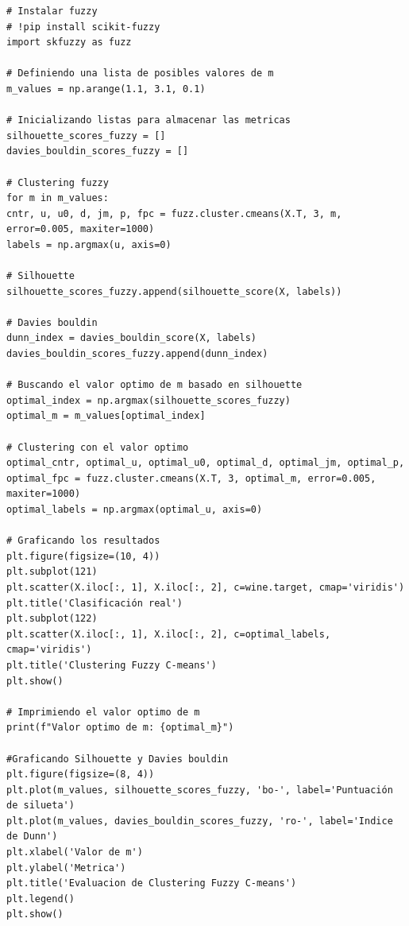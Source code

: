 \documentclass[a4paper, 12pt]{book}
\begin{document}
\begin{verbatim}
# Instalar fuzzy
# !pip install scikit-fuzzy
import skfuzzy as fuzz

# Definiendo una lista de posibles valores de m
m_values = np.arange(1.1, 3.1, 0.1)

# Inicializando listas para almacenar las metricas
silhouette_scores_fuzzy = []
davies_bouldin_scores_fuzzy = []

# Clustering fuzzy
for m in m_values:
cntr, u, u0, d, jm, p, fpc = fuzz.cluster.cmeans(X.T, 3, m, error=0.005, maxiter=1000)
labels = np.argmax(u, axis=0)

# Silhouette
silhouette_scores_fuzzy.append(silhouette_score(X, labels))

# Davies bouldin
dunn_index = davies_bouldin_score(X, labels)
davies_bouldin_scores_fuzzy.append(dunn_index)

# Buscando el valor optimo de m basado en silhouette
optimal_index = np.argmax(silhouette_scores_fuzzy)
optimal_m = m_values[optimal_index]

# Clustering con el valor optimo
optimal_cntr, optimal_u, optimal_u0, optimal_d, optimal_jm, optimal_p, optimal_fpc = fuzz.cluster.cmeans(X.T, 3, optimal_m, error=0.005, maxiter=1000)
optimal_labels = np.argmax(optimal_u, axis=0)

# Graficando los resultados
plt.figure(figsize=(10, 4))
plt.subplot(121)
plt.scatter(X.iloc[:, 1], X.iloc[:, 2], c=wine.target, cmap='viridis')
plt.title('Clasificación real')
plt.subplot(122)
plt.scatter(X.iloc[:, 1], X.iloc[:, 2], c=optimal_labels, cmap='viridis')
plt.title('Clustering Fuzzy C-means')
plt.show()

# Imprimiendo el valor optimo de m
print(f"Valor optimo de m: {optimal_m}")

#Graficando Silhouette y Davies bouldin
plt.figure(figsize=(8, 4))
plt.plot(m_values, silhouette_scores_fuzzy, 'bo-', label='Puntuación de silueta')
plt.plot(m_values, davies_bouldin_scores_fuzzy, 'ro-', label='Indice de Dunn')
plt.xlabel('Valor de m')
plt.ylabel('Metrica')
plt.title('Evaluacion de Clustering Fuzzy C-means')
plt.legend()
plt.show()
\end{verbatim}
\end{document}
